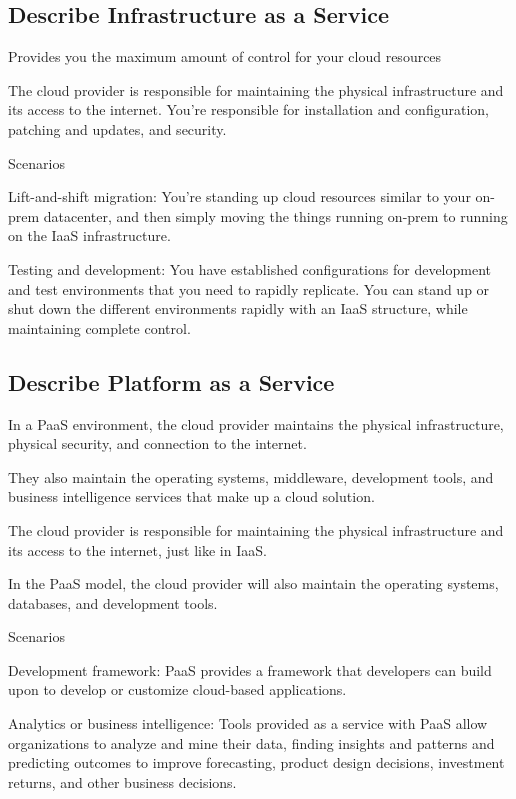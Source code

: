 \documentclass[12pt,a4paper]{report}
\begin{document}
\subsection{Describe Infrastructure as a Service}
\begin{mylist1}
    \item Provides you the maximum amount of control for your cloud resources
    \item The cloud provider is responsible for maintaining the physical infrastructure and its access to the internet. You’re responsible for installation and configuration, patching and updates, and security.
    \item Scenarios
    \begin{mylist2}
        \item Lift-and-shift migration: You’re standing up cloud resources similar to your on-prem datacenter, and then simply moving the things running on-prem to running on the IaaS infrastructure.
        \item Testing and development: You have established configurations for development and test environments that you need to rapidly replicate. You can stand up or shut down the different environments rapidly with an IaaS structure, while maintaining complete control.
    \end{mylist2}
\end{mylist1}

\subsection{Describe Platform as a Service}
\begin{mylist1}
    \item In a PaaS environment, the cloud provider maintains the physical infrastructure, physical security, and connection to the internet.
    \item They also maintain the operating systems, middleware, development tools, and business intelligence services that make up a cloud solution.
    \item The cloud provider is responsible for maintaining the physical infrastructure and its access to the internet, just like in IaaS.
    \item In the PaaS model, the cloud provider will also maintain the operating systems, databases, and development tools.
    \item Scenarios
    \begin{mylist2}
        \item Development framework: PaaS provides a framework that developers can build upon to develop or customize cloud-based applications.
        \item Analytics or business intelligence: Tools provided as a service with PaaS allow organizations to analyze and mine their data, finding insights and patterns and predicting outcomes to improve forecasting, product design decisions, investment returns, and other business decisions.
    \end{mylist2}
\end{mylist1}
\end{document}
